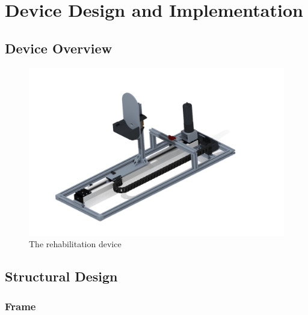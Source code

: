 \documentclass[12pt]{report}
\begin{document}
\chapter{Device Design and Implementation} \label{ch2}

	
		
		
	
	

	\section{Device Overview}
	


	\begin{figure}[h] 
		\centering
		\includegraphics[width=\linewidth]{robo_test1}
		\caption{The rehabilitation device}
		\label{fig:cad}
	\end{figure}
	
	
	\section{Structural Design}
	
	\subsection{Frame}
\end{document}
